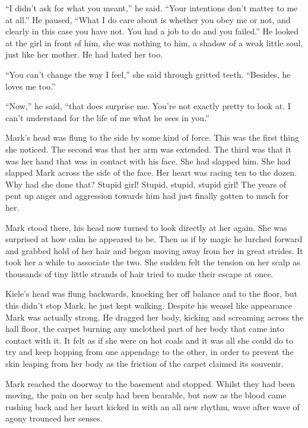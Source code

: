 ``I didn't ask for what you meant,'' he said.  ``Your intentions don't matter to me at all.''  He paused, ``What I do care about is whether you obey me or not, and clearly in this case you have not.  You had a job to do and you failed.''  He looked at the girl in front of him, she was nothing to him, a shadow of a weak little soul, just like her mother.  He had hated her too.

``You can't change the way I feel,'' she said through gritted teeth.  ``Besides, he loves me too.''

``Now,'' he said, ``that does surprise me.  You're not exactly pretty to look at.  I can't understand for the life of me what he sees in you.''

Mark's head was flung to the side by some kind of force.  This was the first thing she noticed.  The second was that her arm was extended.  The third was that it was her hand that was in contact with his face.  She had slapped him.  She had slapped Mark across the side of the face.  Her heart was racing ten to the dozen.  Why had she done that?  Stupid girl! Stupid, stupid, stupid girl!  The years of pent up anger and aggression towards him had just finally gotten to much for her.

Mark stood there, his head now turned to look directly at her again.  She was surprised at how calm he appeared to be.  Then as if by magic he lurched forward and grabbed hold of her hair and began moving away from her in great strides.  It took her a while to associate the two.  She sudden felt the tension on her scalp as thousands of tiny little strands of hair tried to make their escape at once.

Kiele's head was flung backwards, knocking her off balance and to the floor, but this didn't stop Mark, he just kept walking.  Despite his weasel like appearance Mark was actually strong.  He dragged her body, kicking and screaming across the hall floor, the carpet burning any unclothed part of her body that came into contact with it.  It felt as if she were on hot coals and it was all she could do to try and keep hopping from one appendage to the other, in order to prevent the skin leaping from her body as the friction of the carpet claimed its souvenir.

Mark reached the doorway to the basement and stopped.  Whilst they had been moving, the pain on her scalp had been bearable, but now as the blood came rushing back and her heart kicked in with an all new rhythm, wave after wave of agony trounced her senses.  

